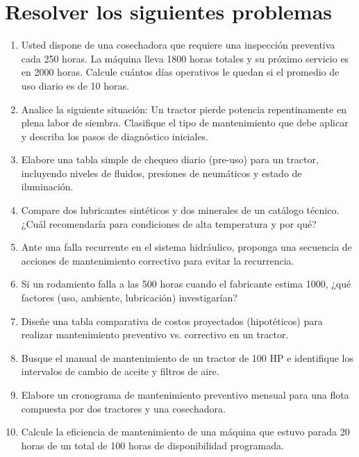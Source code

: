 \section*{\faWrench\space Resolver los siguientes problemas}
\begin{enumerate}
	\item Usted dispone de una cosechadora que requiere una inspección preventiva
	      cada 250 horas. La máquina lleva 1800 horas totales y su próximo servicio es
	      en 2000 horas. Calcule cuántos días operativos le quedan si el promedio de
	      uso diario es de 10 horas.
	\item Analice la siguiente situación: Un tractor pierde potencia repentinamente en
	      plena labor de siembra. Clasifique el tipo de mantenimiento que debe aplicar
	      y describa los pasos de diagnóstico iniciales.
	\item Elabore una tabla simple de chequeo diario (pre-uso) para un tractor,
	      incluyendo niveles de fluidos, presiones de neumáticos y estado de
	      iluminación.
	\item Compare dos lubricantes sintéticos y dos minerales de un catálogo técnico.
	      ¿Cuál recomendaría para condiciones de alta temperatura y por qué?
	\item Ante una falla recurrente en el sistema hidráulico, proponga una secuencia
	      de acciones de mantenimiento correctivo para evitar la recurrencia.
	\item Si un rodamiento falla a las 500 horas cuando el fabricante estima 1000,
	      ¿qué factores (uso, ambiente, lubricación) investigarían?
	\item Diseñe una tabla comparativa de costos proyectados (hipotéticos) para
	      realizar mantenimiento preventivo vs. correctivo en un tractor.
	\item Busque el manual de mantenimiento de un tractor de 100 HP e identifique los
	      intervalos de cambio de aceite y filtros de aire.
	\item Elabore un cronograma de mantenimiento preventivo mensual para una flota
	      compuesta por dos tractores y una cosechadora.
	\item Calcule la eficiencia de mantenimiento de una máquina que estuvo parada 20
	      horas de un total de 100 horas de disponibilidad programada.
\end{enumerate}
